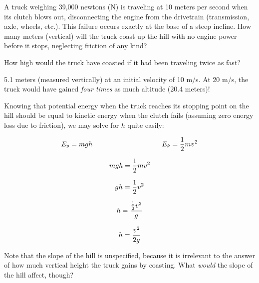 

A truck weighing 39,000 newtons (N) is traveling at 10 meters per second when its clutch blows out, disconnecting the engine from the drivetrain (transmission, axle, wheels, etc.).  This failure occurs exactly at the base of a steep incline.  How many meters (vertical) will the truck coast up the hill with no engine power before it stops, neglecting friction of any kind?

\vskip 10pt

How high would the truck have coasted if it had been traveling twice as fast?







5.1 meters (measured vertically) at an initial velocity of 10 m/s.  At 20 m/s, the truck would have gained {\it four times} as much altitude (20.4 meters)!

\vskip 10pt

Knowing that potential energy when the truck reaches its stopping point on the hill should be equal to kinetic energy when the clutch fails (assuming zero energy loss due to friction), we may solve for $h$ quite easily:

$$E_p = mgh \hbox{\hskip 100pt} E_k = {1 \over 2}mv^2$$

$$mgh = {1 \over 2}mv^2$$

$$gh = {1 \over 2}v^2$$

$$h = {{1 \over 2}v^2 \over g}$$

$$h = {v^2 \over 2g}$$

Note that the slope of the hill is unspecified, because it is irrelevant to the answer of how much vertical height the truck gains by coasting.  What {\it would} the slope of the hill affect, though?











